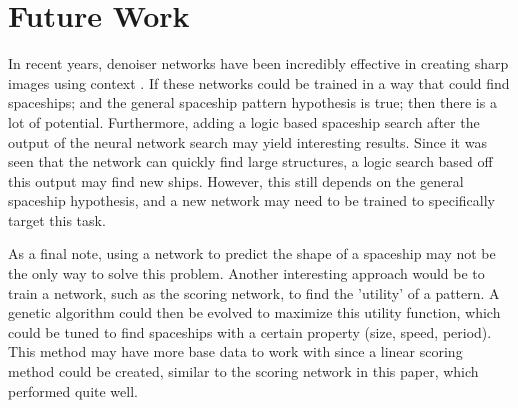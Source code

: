 \documentclass{l4proj}
\begin{document}
\section{Future Work}

In recent years, denoiser networks have been incredibly effective in creating sharp images using context \citep{Zamir_2022_CVPR}. If these networks could be trained in a way that could find spaceships; and the general spaceship pattern hypothesis is true; then there is a lot of potential. Furthermore, adding a logic based spaceship search after the output of the neural network search may yield interesting results. Since it was seen that the network can quickly find large structures, a logic search based off this output may find new ships. However, this still depends on the general spaceship hypothesis, and a new network may need to be trained to specifically target this task.

As a final note, using a network to predict the shape of a spaceship may not be the only way to solve this problem. Another interesting approach would be to train a network, such as the scoring network, to find the 'utility' of a pattern. A genetic algorithm could then be evolved to maximize this utility function, which could be tuned to find spaceships with a certain property (size, speed, period). This method may have more base data to work with since a linear scoring method could be created, similar to the scoring network in this paper, which performed quite well. 






\end{document}
